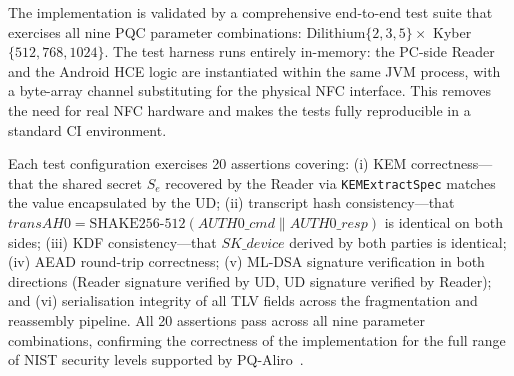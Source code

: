 The implementation is validated by a comprehensive end-to-end test suite
that exercises all nine PQC parameter combinations:
Dilithium$\{2,3,5\} \times$ Kyber$\{512,768,1024\}$.
The test harness runs entirely in-memory: the PC-side Reader and the Android
HCE logic are instantiated within the same JVM process, with a byte-array
channel substituting for the physical NFC interface.
This removes the need for real NFC hardware and makes the tests fully
reproducible in a standard CI environment.

Each test configuration exercises 20 assertions covering: (i) KEM
correctness---that the shared secret $S_e$ recovered by the Reader via
\texttt{KEMExtractSpec} matches the value encapsulated by the UD; (ii)
transcript hash consistency---that $\mathit{transAH0} =
\mathrm{SHAKE256\text{-}512}(\mathit{AUTH0\_cmd} \mathbin{\|} \mathit{AUTH0\_resp})$
is identical on both sides; (iii) KDF consistency---that
$\mathit{SK\_device}$ derived by both parties is identical;
(iv) AEAD round-trip correctness; (v) ML-DSA signature verification in both
directions (Reader signature verified by UD, UD signature verified by Reader);
and (vi) serialisation integrity of all TLV fields across the fragmentation
and reassembly pipeline.
All 20 assertions pass across all nine parameter combinations, confirming
the correctness of the implementation for the full range of NIST security
levels supported by PQ-Aliro~\cite{NIST3PQC:Lima21}.


